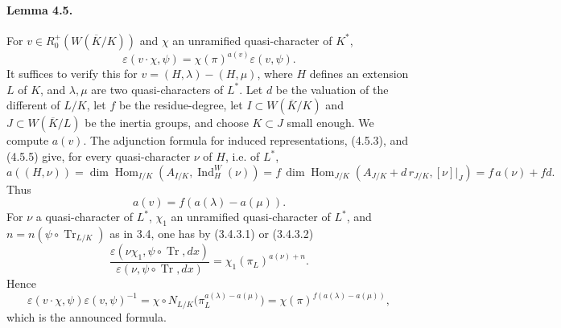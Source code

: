 \documentclass[10pt]{article}
\newcommand{\Hom}{\operatorname{Hom}}
\newcommand{\Ind}{\operatorname{Ind}}
\newcommand{\Tr}{\operatorname{Tr}}
\begin{document}
\paragraph{Lemma 4.5.} For \(v\in R^+_0(W(\overline K/K))\) and \(\chi\) an unramified quasi-character of \(K^*\),
\[
\varepsilon(v\cdot\chi,\psi)=\chi(\pi)^{a(v)}\varepsilon(v,\psi).
\]
It suffices to verify this for \(v=(H,\lambda)-(H,\mu)\), where \(H\) defines an extension \(L\) of \(K\), and \(\lambda,\mu\) are two quasi-characters of \(L^*\). Let \(d\) be the valuation of the different of \(L/K\), let \(f\) be the residue-degree, let \(I\subset W(\overline K/K)\) and \(J\subset W(\overline K/L)\) be the inertia groups, and choose \(K\subset J\) small enough. We compute \(a(v)\). The adjunction formula for induced representations, (4.5.3), and (4.5.5) give, for every quasi-character \(\nu\) of \(H\), i.e. of \(L^*\),
\[
\tag{4.5.1'}
a((H,\nu))
=\dim\Hom_{I/K}(A_{I/K},\Ind_H^W(\nu))
=f\,\dim\Hom_{J/K}(A_{J/K}+d\,r_{J/K},[\nu]|_J)
=f\,a(\nu)+fd.
\]
Thus
\[
a(v)=f(a(\lambda)-a(\mu)).
\]
For \(\nu\) a quasi-character of \(L^*\), \(\chi_1\) an unramified quasi-character of \(L^*\), and \(n=n(\psi\circ\Tr_{L/K})\) as in 3.4, one has by (3.4.3.1) or (3.4.3.2)
\[
\frac{\varepsilon(\nu\chi_1,\psi\circ\Tr,dx)}
     {\varepsilon(\nu,\psi\circ\Tr,dx)}
=
\chi_1(\pi_L)^{a(\nu)+n}.
\]
Hence
\[
\varepsilon(v\cdot\chi,\psi)\varepsilon(v,\psi)^{-1}
=
\chi\circ N_{L/K}\bigl(\pi_L^{a(\lambda)-a(\mu)}\bigr)
=
\chi(\pi)^{f(a(\lambda)-a(\mu))},
\]
which is the announced formula.
\end{document}

